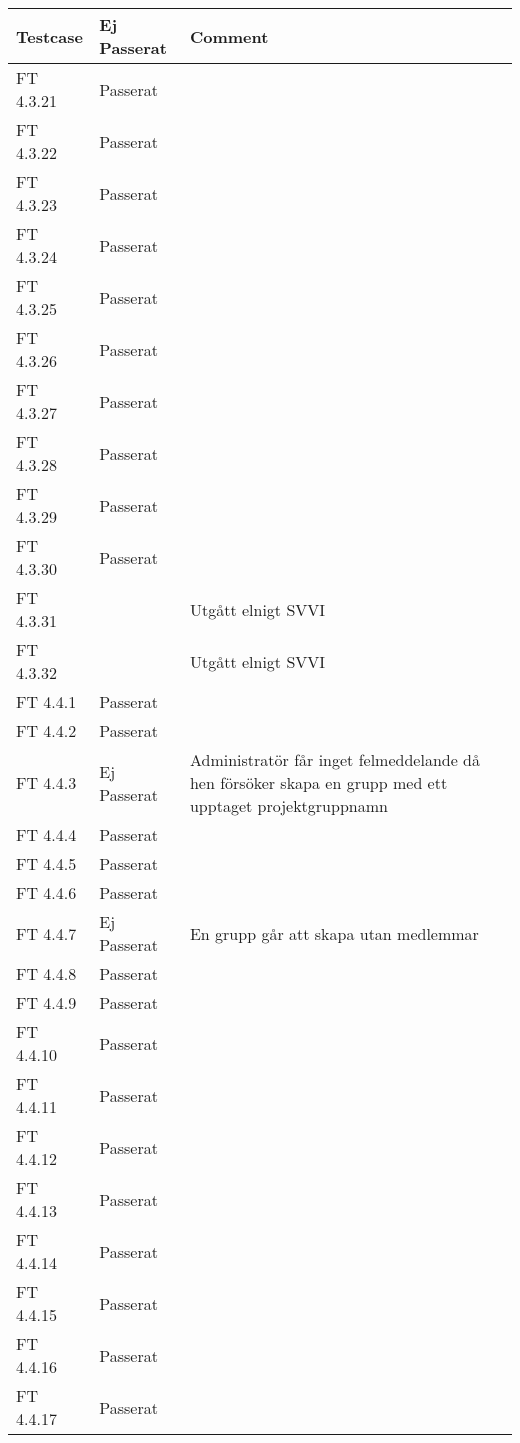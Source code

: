 \documentclass[a4paper]{article}
\begin{document}
\begin{tabular}{| l | l | p{11cm} |}
\hline
Testcase & Ej Passerat & Comment\\
\hline
FT 4.3.21 & Passerat & \\
\hline
FT 4.3.22 & Passerat & \\
\hline
FT 4.3.23 & Passerat & \\
\hline
FT 4.3.24 & Passerat & \\
\hline
FT 4.3.25 & Passerat & \\
\hline
FT 4.3.26 & Passerat & \\
\hline
FT 4.3.27 & Passerat & \\
\hline
FT 4.3.28 & Passerat & \\
\hline
FT 4.3.29 & Passerat & \\
\hline
FT 4.3.30 & Passerat & \\
\hline
FT 4.3.31 & & Utgått elnigt SVVI\\
\hline
FT 4.3.32 & & Utgått elnigt SVVI\\
\hline
FT 4.4.1 & Passerat & \\
\hline
FT 4.4.2 & Passerat & \\
\hline
FT 4.4.3 & Ej Passerat & Administratör får inget felmeddelande då hen försöker skapa en grupp med ett upptaget projektgruppnamn \\
\hline
FT 4.4.4 & Passerat & \\
\hline
FT 4.4.5 & Passerat & \\
\hline
FT 4.4.6 & Passerat & \\
\hline
FT 4.4.7 & Ej Passerat & En grupp går att skapa utan medlemmar\\
\hline
FT 4.4.8 & Passerat & \\
\hline
FT 4.4.9 & Passerat & \\
\hline
FT 4.4.10 & Passerat & \\
\hline
FT 4.4.11 & Passerat & \\
\hline
FT 4.4.12 & Passerat & \\
\hline
FT 4.4.13 & Passerat & \\
\hline
FT 4.4.14 & Passerat & \\
\hline
FT 4.4.15 & Passerat & \\
\hline
FT 4.4.16 & Passerat & \\
\hline
FT 4.4.17 & Passerat & \\
\hline
\end{tabular}
\end{document}

